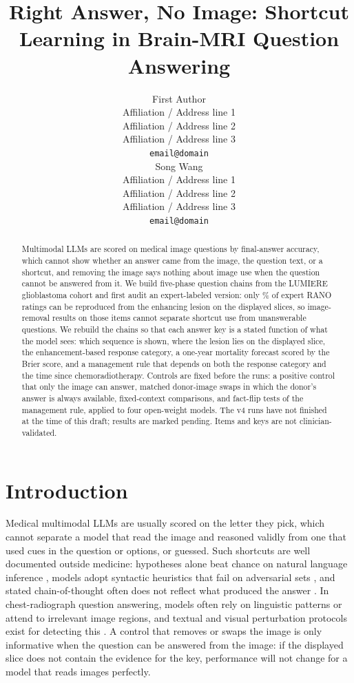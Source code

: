 \documentclass[11pt]{article}
\title{Right Answer, No Image: Shortcut Learning in Brain-MRI Question
Answering}
\author{First Author \\
  Affiliation / Address line 1 \\
  Affiliation / Address line 2 \\
  Affiliation / Address line 3 \\
  \texttt{email@domain} \\\And
  Song Wang \\
  Affiliation / Address line 1 \\
  Affiliation / Address line 2 \\
  Affiliation / Address line 3 \\
  \texttt{email@domain} \\}
\begin{document}
\maketitle
\begin{abstract}
Multimodal LLMs are scored on medical image questions by final-answer accuracy, which cannot show whether an answer came from the image, the question text, or a shortcut, and removing the image says nothing about image use when the question cannot be answered from it. We build five-phase question chains from the LUMIERE glioblastoma cohort and first audit an expert-labeled version: only \vfourConcordantPct{}\% of expert RANO ratings can be reproduced from the enhancing lesion on the displayed slices, so image-removal results on those items cannot separate shortcut use from unanswerable questions. We rebuild the chains so that each answer key is a stated function of what the model sees: which sequence is shown, where the lesion lies on the displayed slice, the enhancement-based response category, a one-year mortality forecast scored by the Brier score, and a management rule that depends on both the response category and the time since chemoradiotherapy. Controls are fixed before the runs: a positive control that only the image can answer, matched donor-image swaps in which the donor's answer is always available, fixed-context comparisons, and fact-flip tests of the management rule, applied to four open-weight models. \ifnum{} The v4 runs have not finished at the time of this draft; results are marked pending. \fi Items and keys are not clinician-validated.
\end{abstract}

\section{Introduction}
\label{sec:introduction}

Medical multimodal LLMs are usually scored on the letter they pick, which cannot separate a model that read the image and reasoned validly from one that used cues in the question or options, or guessed. Such shortcuts are well documented outside medicine: hypotheses alone beat chance on natural language inference \citep{gururangan2018annotation}, models adopt syntactic heuristics that fail on adversarial sets \citep{mccoy2019right}, and stated chain-of-thought often does not reflect what produced the answer \citep{turpin2023language}. In chest-radiograph question answering, models often rely on linguistic patterns or attend to irrelevant image regions, and textual and visual perturbation protocols exist for detecting this \citep{nguyen2025localizing}. A control that removes or swaps the image is only informative when the question can be answered from the image: if the displayed slice does not contain the evidence for the key, performance will not change for a model that reads images perfectly.
\end{document}
